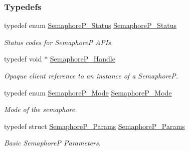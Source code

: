 \subsubsection*{Typedefs}
\begin{DoxyCompactItemize}
\item 
typedef enum \hyperlink{_semaphore_p_8h_a5d4aebe0ebff4aaadba07d853ae4ee42}{Semaphore\+P\+\_\+\+Status} \hyperlink{_semaphore_p_8h_abec0378f2d6838c402bbe0bfa155c170}{Semaphore\+P\+\_\+\+Status}
\begin{DoxyCompactList}\small\item\em Status codes for Semaphore\+P A\+P\+Is. \end{DoxyCompactList}\item 
typedef void $\ast$ \hyperlink{_semaphore_p_8h_a7f34865f33e666455692544e5f12d1f2}{Semaphore\+P\+\_\+\+Handle}
\begin{DoxyCompactList}\small\item\em Opaque client reference to an instance of a Semaphore\+P. \end{DoxyCompactList}\item 
typedef enum \hyperlink{_semaphore_p_8h_add3b3b8c066d33d0067fac18e839f8ff}{Semaphore\+P\+\_\+\+Mode} \hyperlink{_semaphore_p_8h_a1c637322a42ff17a900127069a8c441a}{Semaphore\+P\+\_\+\+Mode}
\begin{DoxyCompactList}\small\item\em Mode of the semaphore. \end{DoxyCompactList}\item 
typedef struct \hyperlink{struct_semaphore_p___params}{Semaphore\+P\+\_\+\+Params} \hyperlink{_semaphore_p_8h_a83120723ac10a70459fabc2093ac18f9}{Semaphore\+P\+\_\+\+Params}
\begin{DoxyCompactList}\small\item\em Basic Semaphore\+P Parameters. \end{DoxyCompactList}\end{DoxyCompactItemize}

